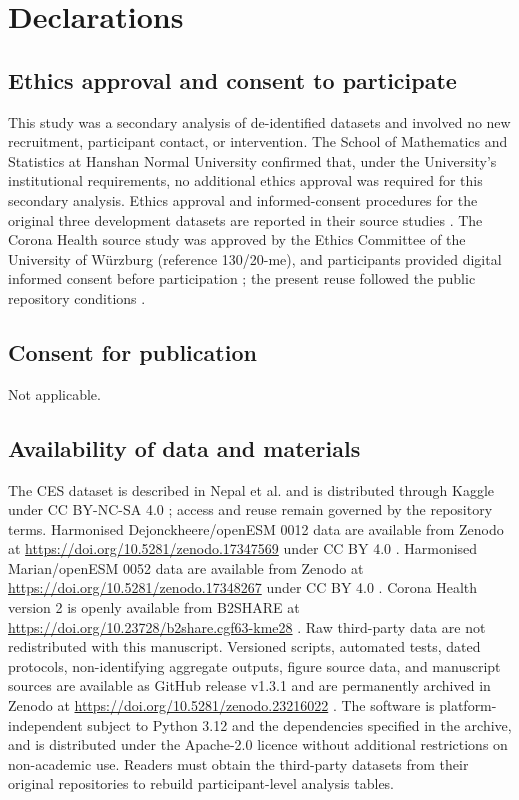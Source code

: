\documentclass[pdflatex,sn-vancouver-num]{sn-jnl}
\begin{document}
\section{Declarations}

\subsection{Ethics approval and consent to participate}

This study was a secondary analysis of de-identified datasets and involved no new recruitment, participant contact, or intervention. The School of Mathematics and Statistics at Hanshan Normal University confirmed that, under the University's institutional requirements, no additional ethics approval was required for this secondary analysis. Ethics approval and informed-consent procedures for the original three development datasets are reported in their source studies \cite{ref11,ref12,ref13}. The Corona Health source study was approved by the Ethics Committee of the University of W\"urzburg (reference 130/20-me), and participants provided digital informed consent before participation \cite{ref28}; the present reuse followed the public repository conditions \cite{ref24}.

\subsection{Consent for publication}

Not applicable.

\subsection{Availability of data and materials}

The CES dataset is described in Nepal et al. \cite{ref11} and is distributed through Kaggle under CC BY-NC-SA 4.0 \cite{ref26}; access and reuse remain governed by the repository terms. Harmonised Dejonckheere/openESM 0012 data are available from Zenodo at \url{https://doi.org/10.5281/zenodo.17347569} under CC BY 4.0 \cite{ref16}. Harmonised Marian/openESM 0052 data are available from Zenodo at \url{https://doi.org/10.5281/zenodo.17348267} under CC BY 4.0 \cite{ref17}. Corona Health version 2 is openly available from B2SHARE at \url{https://doi.org/10.23728/b2share.cgf63-kme28} \cite{ref24}. Raw third-party data are not redistributed with this manuscript. Versioned scripts, automated tests, dated protocols, non-identifying aggregate outputs, figure source data, and manuscript sources are available as GitHub release v1.3.1 and are permanently archived in Zenodo at \url{https://doi.org/10.5281/zenodo.23216022} \cite{ref25}. The software is platform-independent subject to Python 3.12 and the dependencies specified in the archive, and is distributed under the Apache-2.0 licence without additional restrictions on non-academic use. Readers must obtain the third-party datasets from their original repositories to rebuild participant-level analysis tables.
\end{document}
